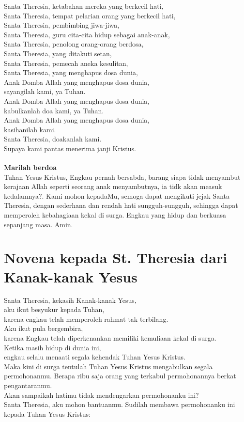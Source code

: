 \documentclass[12pt]{scrartcl}
\begin{document}
Santa Theresia, ketabahan mereka yang berkecil hati,\\
Santa Theresia, tempat pelarian orang yang berkecil hati,\\
Santa Theresia, pembimbing jiwa-jiwa,\\
Santa Theresia, guru cita-cita hidup sebagai anak-anak,\\
Santa Theresia, penolong orang-orang berdosa,\\
Santa Theresia, yang ditakuti setan,\\
Santa Theresia, pemecah aneka kesulitan,\\
Santa Theresia, yang menghapus dosa dunia,\\
Anak Domba Allah yang menghapus dosa dunia,\\
sayangilah kami, ya Tuhan.\\
Anak Domba Allah yang menghapus dosa dunia,\\
kabulkanlah doa kami, ya Tuhan.\\
Anak Domba Allah yang menghapus dosa dunia,\\
kasihanilah kami.\\
Santa Theresia, doakanlah kami.\\
Supaya kami pantas menerima janji Kristus.\\
\\
\textbf{Marilah berdoa}\\
Tuhan Yesus Kristus, Engkau pernah bersabda, barang siapa tidak menyambut kerajaan Allah seperti seorang anak menyambutnya, ia tidk akan measuk kedalamnya?. Kami mohon kepadaMu, semoga dapat mengikuti jejak Santa Theresia, dengan sederhana dan rendah hati sungguh-sungguh, sehingga dapat memperoleh kebahagiaan kekal di surga. Engkau yang hidup dan berkuasa sepanjang masa. 
Amin.

\newpage
\section*{Novena kepada St. Theresia dari Kanak-kanak Yesus}
\normalsize
Santa Theresia, kekasih Kanak-kanak Yesus,\\
aku ikut besyukur kepada Tuhan, \\
karena engkau telah memperoleh rahmat tak terbilang. \\
Aku ikut pula bergembira, \\
karena Engkau telah diperkenankan memiliki 
kemuliaan kekal di surga.\\
Ketika masih hidup di dunia ini, \\
engkau selalu menaati segala kehendak Tuhan Yesus Kristus. \\
Maka kini di surga tentulah Tuhan Yesus Kristus mengabulkan segala permohonanmu. 
Berapa ribu saja orang yang terkabul permohonannya berkat pengantaranmu. \\
Akan sampaikah hatimu tidak mendengarkan permohonanku ini?\\
Santa Theresia, aku mohon bantuanmu. Sudilah membawa permohonanku ini kepada Tuhan Yesus Kristus:\\
\end{document}
